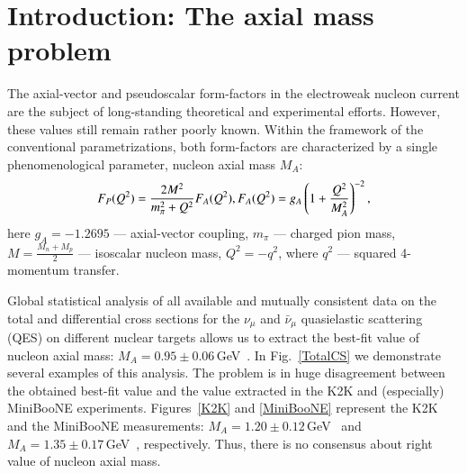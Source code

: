\section{Introduction: The axial mass problem}
The axial-vector and pseudoscalar form-factors in the electroweak nucleon current are the subject of long-standing theoretical and experimental efforts. However, these values still remain rather poorly known. Within the framework of the conventional parametrizations, both form-factors are characterized by a single phenomenological parameter, nucleon axial mass $M_A$:
\begin{equation}
F_{P}(Q^{2})={}\frac{2M^{2}}{m_{\pi}^{2}+Q^{2}}F_{A}(Q^{2}),\\
F_{A}(Q^{2})={}g_{A}\left(1+\frac{Q^{2}}{M_{A}^{2}}\right)^{-2},
\end{equation}
here $g_{A}=-1.2695$ --- axial-vector coupling, $m_{\pi}$ --- charged pion mass, $M=\frac{M_{n}+M_{p}}{2}$ --- isoscalar nucleon mass, $Q^{2}=-q^{2}$, where $q^{2}$ --- squared 4-momentum transfer.

Global statistical analysis of all available and mutually consistent data on the total and differential cross sections for the $\nu_{\mu}$ and $\bar\nu_{\mu}$ quasielastic scattering (QES) on different nuclear targets allows us to extract the best-fit value of nucleon axial mass: $M_A=0.95\pm0.06$\,GeV~\cite{Kuzmin:2007kr}. In Fig.~\ref{TotalCS} we demonstrate several examples of this analysis. The problem is in huge disagreement between the obtained best-fit value and the value extracted in the K2K and (especially) MiniBooNE experiments. Figures~\ref{K2K} and \ref{MiniBooNE} represent the K2K and the MiniBooNE measurements: $M_A=1.20\pm0.12$\,GeV~\cite{Gran:2006jn} and $M_{A}=1.35\pm0.17$\,GeV~\cite{AguilarArevalo:2010zc}, respectively. Thus, there is no consensus about right value of nucleon axial mass.

